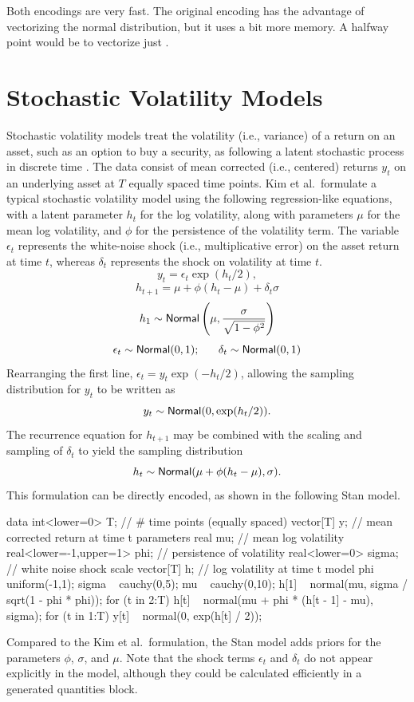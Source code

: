Both encodings are very fast.  The original encoding has the advantage
of vectorizing the normal distribution, but it uses a bit more memory.
A halfway point would be to vectorize just .



\section{Stochastic Volatility Models}

Stochastic volatility models treat the volatility (i.e., variance) of
a return on an asset, such as an option to buy a security, as
following a latent stochastic process in discrete time
\citep{KimShephardChib:1998}.  The data consist of mean corrected
(i.e., centered) returns $y_t$ on an underlying asset at $T$ equally
spaced time points.  Kim et al.\ formulate a typical stochastic
volatility model using the following regression-like equations, with a
latent parameter $h_t$ for the log volatility, along with parameters
$\mu$ for the mean log volatility, and $\phi$ for the persistence of
the volatility term.  The variable $\epsilon_t$ represents the
white-noise shock (i.e., multiplicative error) on the asset return at
time $t$, whereas $\delta_t$ represents the shock on volatility at
time $t$.
\[
y_t = \epsilon_t \exp(h_t / 2),
\]
\[
h_{t+1} = \mu + \phi (h_t - \mu) + \delta_t \sigma
\]
\[
h_1 \sim \distro{Normal}\left( \mu, \frac{\sigma}{\sqrt{1 - \phi^2}} \right)
\]
\[
\epsilon_t \sim \distro{Normal}(0,1); \ \ \ \ \  \delta_t \sim \distro{Normal}(0,1)
\]
%
Rearranging the first line, $\epsilon_t = y_t \exp(-h_t / 2)$,
allowing the sampling distribution for $y_t$ to be written as
\[ 
y_t \sim \distro{Normal}(0,\exp(h_t/2)).
\]
The recurrence equation for $h_{t+1}$ may be combined with the
scaling and sampling of $\delta_t$ to yield the sampling distribution
\[
h_t \sim \distro{Normal}(\mu + \phi(h_t - \mu), \sigma).
\]
This formulation can be directly encoded, as shown in the following
Stan model.
%
\begin{stancode}
data {
  int<lower=0> T;   // # time points (equally spaced)
  vector[T] y;      // mean corrected return at time t
}
parameters {
  real mu;                     // mean log volatility
  real<lower=-1,upper=1> phi;  // persistence of volatility
  real<lower=0> sigma;         // white noise shock scale
  vector[T] h;                 // log volatility at time t
}
model {
  phi ~ uniform(-1,1);
  sigma ~ cauchy(0,5);
  mu ~ cauchy(0,10);  
  h[1] ~ normal(mu, sigma / sqrt(1 - phi * phi));
  for (t in 2:T)
    h[t] ~ normal(mu + phi * (h[t - 1] -  mu), sigma);
  for (t in 1:T)
    y[t] ~ normal(0, exp(h[t] / 2));
}
\end{stancode}
%
Compared to the Kim et al.\ formulation, the Stan model adds priors
for the parameters $\phi$, $\sigma$, and $\mu$.  Note that the shock
terms $\epsilon_t$ and $\delta_t$ do not appear explicitly in the
model, although they could be calculated efficiently in a generated
quantities block.

